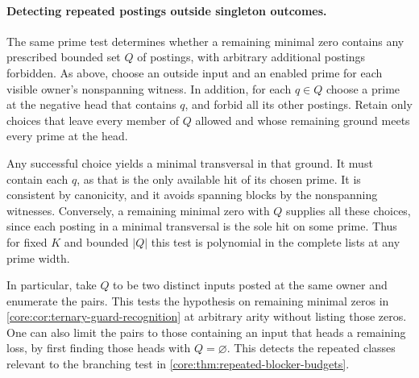 \paragraph{Detecting repeated postings outside singleton outcomes.}
The same prime test determines whether a remaining minimal zero
contains any prescribed bounded set $Q$ of postings, with arbitrary
additional postings forbidden. As above, choose an outside input
and an enabled prime for each visible owner's nonspanning witness.
In addition, for each $q\in Q$ choose a prime at the negative head
that contains $q$, and forbid all its other postings. Retain only
choices that leave every member of $Q$ allowed and whose remaining
ground meets every prime at the head.

Any successful choice yields a minimal transversal in that ground.
It must contain each $q$, as that is the only available hit of
its chosen prime. It is consistent by canonicity, and it avoids
spanning blocks by the nonspanning witnesses. Conversely, a
remaining minimal zero with $Q$ supplies all these choices,
since each posting in a minimal transversal is the sole hit on
some prime. Thus for fixed $K$ and bounded $|Q|$ this test is
polynomial in the complete lists at any prime width.

In particular, take $Q$ to be two distinct inputs posted at the
same owner and enumerate the pairs. This tests the hypothesis on
remaining minimal zeros in \cref{core:cor:ternary-guard-recognition}
at arbitrary arity without listing those zeros. One can also limit
the pairs to those containing an input that heads a remaining
loss, by first finding those heads with $Q=\varnothing$. This
detects the repeated classes relevant to the branching test in
\cref{core:thm:repeated-blocker-budgets}.

